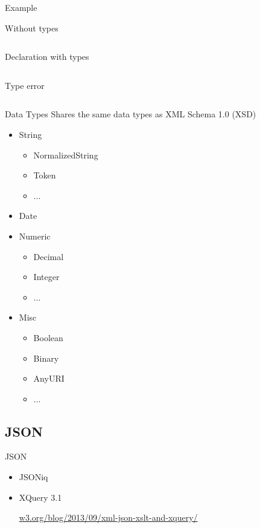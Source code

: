 \documentclass[sans]{beamer}
\begin{document}
\begin{frame}{Example}
	\begin{block}{Without types}
		\inputminted[fontsize=\tiny]{xquery}{codes/ex26.xq}
	\end{block}
	\pause
	\begin{block}{Declaration with types}
		\inputminted[fontsize=\tiny]{xquery}{codes/ex27.xq}
	\end{block}
	\pause
	\begin{block}{Type error}
		\inputminted[fontsize=\tiny]{xquery}{codes/ex28.xq}
	\end{block}
\end{frame}

\begin{frame}{Data Types}
	Shares the same data types as XML Schema 1.0 (XSD)

	\begin{itemize}
		\item String
			\begin{itemize}
				\item NormalizedString
				\item Token
				\item ...
			\end{itemize}
		\item Date
		\item Numeric
			\begin{itemize}
				\item Decimal
				\item Integer
				\item ...
			\end{itemize}
		\item Misc
			\begin{itemize}
				\item Boolean
				\item Binary
				\item AnyURI
				\item ...
			\end{itemize}
	\end{itemize}
\end{frame}

\subsection{JSON}

\begin{frame}{JSON}
	\begin{itemize}
		\item JSONiq
		\item XQuery 3.1

		\color{blue} \url{w3.org/blog/2013/09/xml-json-xslt-and-xquery/} \color{black}
	\end{itemize}
\end{frame}
\end{document}
